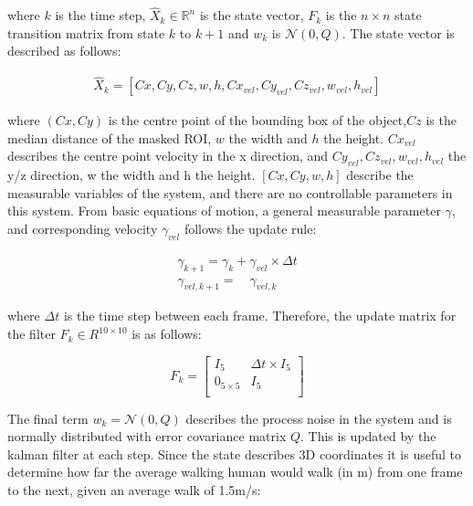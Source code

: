 \documentclass[11pt,twoside]{report}
\begin{document}
where $k$ is the time step, $\hat{X}_{k} \in \mathbb{R}^{n}$ is the state vector, $F_{k}$ is the $n \times n$ state transition matrix from state $k$ to $k+1$ and $w_{k}$ is $\mathcal{N}(0,Q)$. The state vector is described as follows:

\begin{equation}
\begin{aligned}
\hat{X}_{k} =  [Cx,Cy,Cz,w,h,Cx_{vel},Cy_{vel},Cz_{vel},w_{vel},h_{vel}]
\end{aligned}
\end{equation}

where $(Cx,Cy)$ is the centre point of the bounding box of the object,$Cz$ is the median distance of the masked ROI, $w$ the width and $h$ the height. $Cx_{vel}$ describes the centre point velocity in the x direction, and $Cy_{vel},Cz_{vel},w_{vel},h_{vel}$ the y/z direction, w the width and h the height. $[Cx,Cy,w,h]$ describe the measurable variables of the system, and there are no controllable parameters in this system. From basic equations of motion, a general measurable parameter $\gamma$, and corresponding velocity  $\gamma_{vel}$ follows the update rule:

\begin{equation}
\begin{aligned}
\gamma_{k+1} = \gamma_{k} + \gamma_{vel} \times \Delta t \\
\gamma_{vel,k+1} = \quad \gamma_{vel,k}
\end{aligned}
\end{equation}

where $\Delta t$ is the time step between each frame. Therefore, the update matrix for the filter $F_{k} \in R^{10 \times 10}$ is as follows:

\begin{equation}
F_{k} = 
\begin{bmatrix}
I_{5} & \Delta t \times I_{5} \\[0.3em]

0_{5 \times 5} & I_{5} \\[0.3em]
\end{bmatrix}
\end{equation}

The final term $w_{k} = \mathcal{N}(0,Q)$ describes the process noise in the system and is normally distributed with error covariance matrix $Q$. This is updated by the kalman filter at each step. Since the state describes 3D coordinates it is useful to determine how far the average walking human would walk (in m) from one frame to the next, given an average walk of 1.5m/s:
\end{document}
